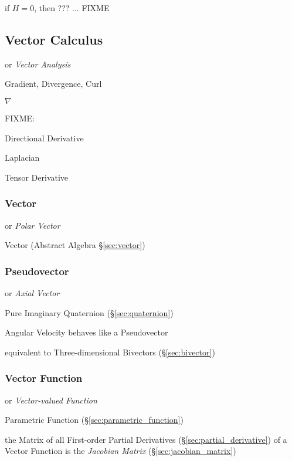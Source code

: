 if $H = 0$, then ??? ... FIXME



\subsection{Vector Calculus}\label{sec:vector_calclulus}

or \emph{Vector Analysis}

Gradient, Divergence, Curl

$\nabla$

FIXME:

Directional Derivative

Laplacian

Tensor Derivative



\subsubsection{Vector}\label{sec:linear_vector}

or \emph{Polar Vector}

\fist Vector (Abstract Algebra \S\ref{sec:vector})



\subsubsection{Pseudovector}\label{sec:linear_vector}

or \emph{Axial Vector}

\fist Pure Imaginary Quaternion (\S\ref{sec:quaternion})

Angular Velocity behaves like a Pseudovector

equivalent to Three-dimensional Bivectors (\S\ref{sec:bivector})



\subsubsection{Vector Function}\label{sec:vector_function}

or \emph{Vector-valued Function}

\fist Parametric Function (\S\ref{sec:parametric_function})

the Matrix of all First-order Partial Derivatives
(\S\ref{sec:partial_derivative}) of a Vector Function is the \emph{Jacobian
  Matrix} (\S\ref{sec:jacobian_matrix})

